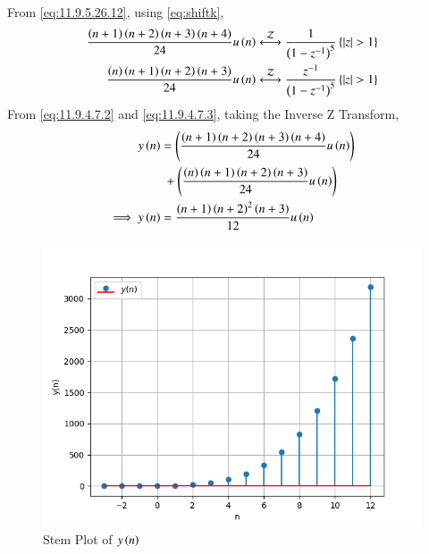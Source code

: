 \documentclass[journal,12pt,twocolumn]{IEEEtran}
\theoremstyle{remark}
\begin{document}
From \eqref{eq:11.9.5.26.12}, using \eqref{eq:shiftk},
\begin{align}
    \frac{\brak{n+1}\brak{n+2}\brak{n+3}\brak{n+4}}{24}u\brak{n}&\system{Z}\frac{1}{\brak{1-z^{-1}}^5}\label{eq:11.9.4.7.2}\cbrak{\abs{z}>1}\\
    \frac{\brak{n}\brak{n+1}\brak{n+2}\brak{n+3}}{24}u\brak{n}&\system{Z}\frac{z^{-1}}{\brak{1-z^{-1}}^5}\label{eq:11.9.4.7.3}\cbrak{\abs{z}>1}
\end{align}
From \eqref{eq:11.9.4.7.2} and \eqref{eq:11.9.4.7.3}, taking the Inverse Z Transform,
\begin{align}
    y\left(n\right)&=\left(\frac{\left(n+1\right)\left(n+2\right)\left(n+3\right)\left(n+4\right)}{24}u\left(n\right)\right)\notag\\
    &\;+\left(\frac{\left(n\right)\left(n+1\right)\left(n+2\right)\left(n+3\right)}{24}u\left(n\right)\right)\\
    \implies y\left(n\right)&=\frac{\left(n+1\right)\left(n+2\right)^2\left(n+3\right)}{12}u\left(n\right)
\end{align}
\begin{figure}[h!]
    \centering
    \includegraphics[width=0.97\linewidth]{figs/Figure_1.png}
    \caption{Stem Plot of $y\left(n\right)$}
\end{figure}
\end{document}
